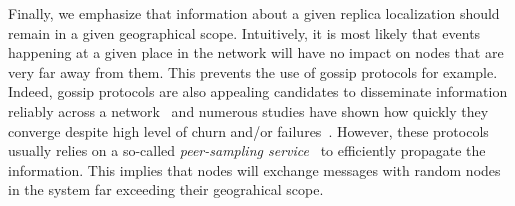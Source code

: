 Finally, we emphasize that information about a given replica localization should remain in a given geographical scope. 
Intuitively, it is most likely that events happening at a given place in the network will have no impact on nodes that are very far away from them.
This prevents the use of gossip protocols for example.  Indeed, gossip protocols are also appealing candidates to disseminate information reliably across a network~\cite{epidemic-protocol} and numerous studies have shown how quickly they converge despite high level of churn and/or failures~\cite{lpbcast}.
However, these protocols usually relies on a so-called \textit{peer-sampling service}~\cite{jelasity2007gossip} to efficiently propagate the information. This implies that nodes will exchange messages with random nodes in the system far exceeding their geograhical scope. 


